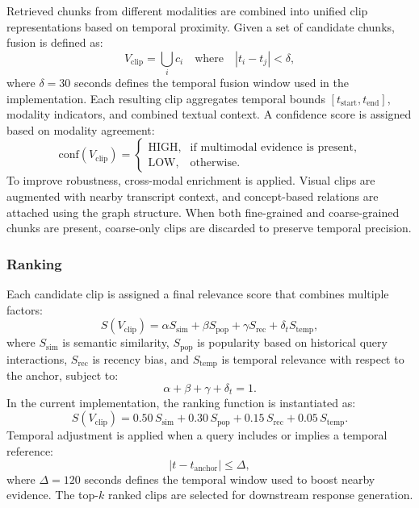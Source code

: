 \documentclass[conference]{IEEEtran}
\begin{document}
    Retrieved chunks from different modalities are combined into unified clip representations based on temporal proximity. Given a set of candidate chunks, fusion is defined as:
    \begin{equation}
    V_{\text{clip}} = \bigcup_i c_i \quad \text{where} \quad |t_i - t_j| < \delta,
    \end{equation}
    where $\delta = 30$ seconds defines the temporal fusion window used in the implementation. Each resulting clip aggregates temporal bounds $[t_{\text{start}}, t_{\text{end}}]$, modality indicators, and combined textual context. A confidence score is assigned based on modality agreement:
    \begin{equation}
    \text{conf}(V_{\text{clip}})=
    \begin{cases}
    \text{HIGH}, & \text{if multimodal evidence is present}, \\
    \text{LOW}, & \text{otherwise}.
    \end{cases}
    \end{equation}
    To improve robustness, cross-modal enrichment is applied. Visual clips are augmented with nearby transcript context, and concept-based relations are attached using the graph structure. When both fine-grained and coarse-grained chunks are present, coarse-only clips are discarded to preserve temporal precision.

    \subsubsection{Ranking}

    Each candidate clip is assigned a final relevance score that combines multiple factors:
    \begin{equation}
    S(V_{\text{clip}}) = \alpha S_{\text{sim}} + \beta S_{\text{pop}} + \gamma S_{\text{rec}} + \delta_t S_{\text{temp}},
    \end{equation}
    where $S_{\text{sim}}$ is semantic similarity, $S_{\text{pop}}$ is popularity based on historical query interactions, $S_{\text{rec}}$ is recency bias, and $S_{\text{temp}}$ is temporal relevance with respect to the anchor, subject to:
    \begin{equation}
    \alpha + \beta + \gamma + \delta_t = 1.
    \end{equation}
    In the current implementation, the ranking function is instantiated as:
    \begin{equation}
    S(V_{\text{clip}}) = 0.50\,S_{\text{sim}} + 0.30\,S_{\text{pop}} + 0.15\,S_{\text{rec}} + 0.05\,S_{\text{temp}}.
    \end{equation}
    Temporal adjustment is applied when a query includes or implies a temporal reference:
    \begin{equation}
    |t - t_{\text{anchor}}| \leq \Delta,
    \end{equation}
    where $\Delta = 120$ seconds defines the temporal window used to boost nearby evidence. The top-$k$ ranked clips are selected for downstream response generation.
\end{document}
